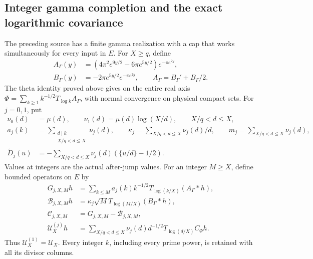 \documentclass[11pt]{article}
\theoremstyle{remark}\newtheorem{remark}[theorem]{Remark}
\begin{document}
\subsection{Integer gamma completion and the exact logarithmic covariance}
\label{sec:integer-gamma-completion}

The preceding source has a finite gamma realization with a cap
that works simultaneously for every input in \(E\).
For \(X\ge q\), define
\[
 \begin{split}
 A_\Gamma(y)&=(4\pi^2e^{9y/2}-6\pi e^{5y/2})
                                      e^{-\pi e^{2y}},\\
 B_\Gamma(y)&=-2\pi e^{5y/2}e^{-\pi e^{2y}},\qquad
 A_\Gamma=B_\Gamma'+B_\Gamma/2 .
 \end{split}
 \tag{GC1}
\]
The theta identity proved above gives on the entire real axis
\(\Phi=\sum_{k\ge1}k^{-1/2}T_{\log k}A_\Gamma\), with normal
convergence on physical compact sets. For \(j=0,1\), put
\[
 \begin{split}
 \nu_0(d)&=\mu(d),\qquad
 \nu_1(d)=\mu(d)\log(X/d),\qquad X/q<d\le X,\\
 a_j(k)&=\sum_{\substack{d\mid k\\X/q<d\le X}}\nu_j(d),\qquad
 \kappa_j=\sum_{X/q<d\le X}\nu_j(d)/d,\qquad
 m_j=\sum_{X/q<d\le X}\nu_j(d),\\
 \widetilde D_j(u)&=-\sum_{X/q<d\le X}
                         \nu_j(d)(\{u/d\}-1/2).
 \end{split}
 \tag{GC2}
\]
Values at integers are the actual after-jump values. For an
integer \(M\ge X\), define bounded operators on \(E\) by
\[
 \begin{split}
 G_{j,X,M}h&=\sum_{k\le M}a_j(k)k^{-1/2}
                         T_{\log(k/X)}(A_\Gamma*h),\\
 \mathcal B_{j,X,M}h&=\kappa_j\sqrt M
                         T_{\log(M/X)}(B_\Gamma*h),\\
 \mathcal C_{j,X,M}&=G_{j,X,M}-\mathcal B_{j,X,M},\\
 \mathcal U_X^{(j)}h&=\sum_{X/q<d\le X}\nu_j(d)d^{-1/2}
                                      T_{\log(d/X)}C_\Phi h .
 \end{split}
 \tag{GC3}
\]
Thus \(\mathcal U_X^{(1)}=\mathcal U_X\).
Every integer \(k\), including every prime power, is retained
with all its divisor columns.
\end{document}
